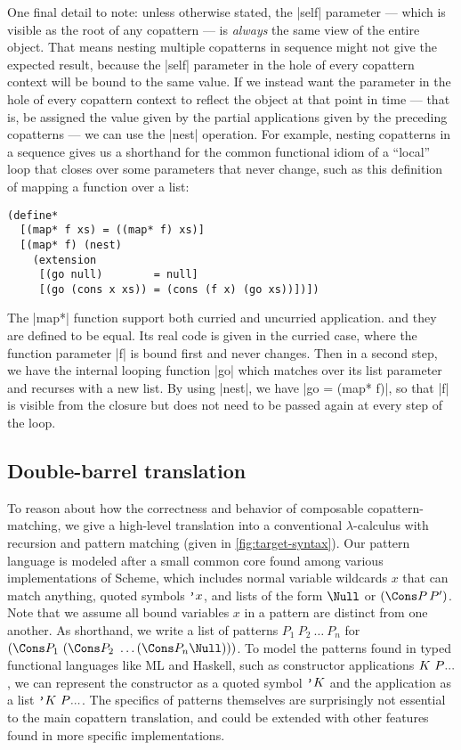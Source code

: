 One final detail to note: unless otherwise stated, the \scm|self| parameter --- which is visible as the root of any copattern --- is \emph{always} the same view of the entire object.
That means nesting multiple copatterns in sequence might not give the expected result, because the \scm|self| parameter in the hole of every copattern context will be bound to the same value.
If we instead want the parameter in the hole of every copattern context to reflect the object at that point in time --- that is, be assigned the value given by the partial applications given by the preceding copatterns --- we can use the \scm|nest| operation.
For example, nesting copatterns in a sequence gives us a shorthand for the common functional idiom of a ``local'' loop that closes over some parameters that never change, such as this definition of mapping a function over a list:
\begin{verbatim}
(define*
  [(map* f xs) = ((map* f) xs)]
  [(map* f) (nest)
    (extension
     [(go null)        = null]
     [(go (cons x xs)) = (cons (f x) (go xs))])])
\end{verbatim}
The \scm|map*| function support both curried and uncurried application. and they are defined to be equal.
Its real code is given in the curried case, where the function parameter \scm|f| is bound first and never changes.
Then in a second step, we have the internal looping function \scm|go| which matches over its list parameter and recurses with a new list.
By using \scm|nest|, we have \scm|go = (map* f)|, so that \scm|f| is visible from the closure but does not need to be passed again at every step of the loop.

\subsection{Double-barrel translation}

To reason about how the correctness and behavior of composable copattern-matching, we give a high-level translation into a conventional $\lambda$-calculus with recursion and pattern matching (given in \cref{fig:target-syntax}).
Our pattern language is modeled after a small common core found among various implementations of Scheme, which includes normal variable wildcards $x$ that can match anything, quoted symbols $\text{\tt'}{x}$, and lists of the form $\Null$ or $(\Cons P \, P')$.
Note that we assume all bound variables $x$ in a pattern are distinct from one another.
As shorthand, we write a list of patterns $P_1 ~ P_2 ~ \dots ~ P_n$ for $(\Cons P_1 ~ (\Cons P_2 ~ \dots (\Cons P_n \Null)))$.
To model the patterns found in typed functional languages like ML and Haskell, such as constructor applications $K ~ P\overset{{}_{}}{...}$, we can represent the constructor  as a quoted symbol $\text{\tt'}{K}$ and the application as a list $\text{\tt'}{K} ~ P\overset{{}_{}}{...}$.
The specifics of patterns themselves are surprisingly not essential to the main copattern translation, and could be extended with other features found in more specific implementations.

